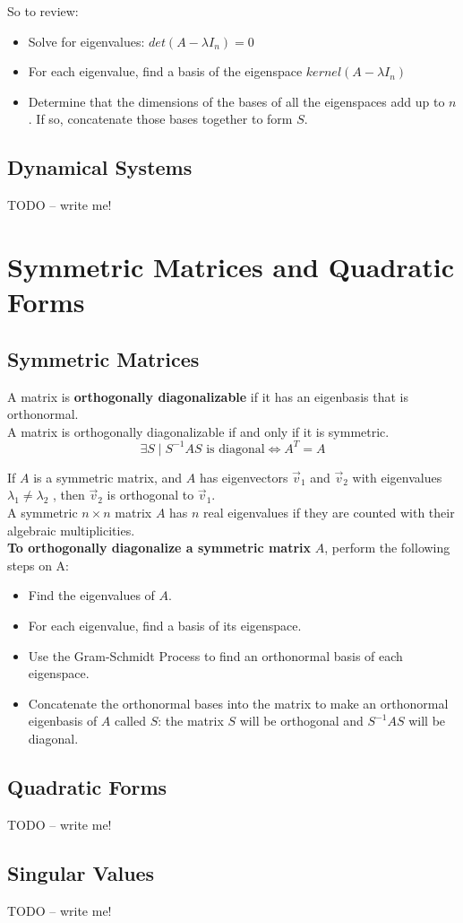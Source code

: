 \documentclass[]{scrartcl}
\begin{document}
	So to review:
	\begin{itemize}
		\item Solve for eigenvalues: $ det(A - \lambda I_n) = 0 $
		\item For each eigenvalue, find a basis of the eigenspace $kernel(A - \lambda I_n)$
		\item Determine that the dimensions of the bases of all the eigenspaces add up to $n$. If so, concatenate those bases together to form $S$.
	\end{itemize} 
	
	\subsection{Dynamical Systems}
	TODO -- write me!
	
	\setcounter{section}{7}
	\section{Symmetric Matrices and Quadratic Forms}
	\subsection{Symmetric Matrices}
	A matrix is \textbf{orthogonally diagonalizable} if it has an eigenbasis that is orthonormal.\\
	
	 A matrix is orthogonally diagonalizable if and only if it is symmetric.
	$$
	\exists S \mid S^{-1}AS \text{ is diagonal} \iff A^T = A 
	$$
	
	 If $A$ is a symmetric matrix, and $A$ has eigenvectors $\vec{v}_1$ and $\vec{v}_2$ with eigenvalues $\lambda_1 \neq \lambda_2$ , then $\vec{v}_2$ is orthogonal to $\vec{v}_1$.\\
	
	 A symmetric $n \times n$ matrix $A$ has $n$ real eigenvalues if they are counted with their algebraic multiplicities.\\
	 
	 \textbf{To orthogonally diagonalize a symmetric matrix} $A$, perform the following steps on A:
	 \begin{itemize}
	 	\item Find the eigenvalues of $A$.
	 	\item For each eigenvalue, find a basis of its eigenspace.
	 	\item Use the Gram-Schmidt Process to find an orthonormal basis of each eigenspace.
	 	\item Concatenate the orthonormal bases into the matrix to make an orthonormal eigenbasis of $A$ called $S$: the matrix $S$ will be orthogonal and $S^{-1}AS$ will be diagonal.
	 \end{itemize}
	
	\subsection{Quadratic Forms}
	TODO -- write me!
	
	\subsection{Singular Values}
	TODO -- write me!
	
\end{document}
